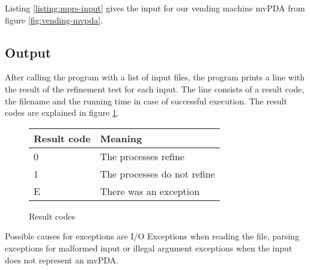 \begin{example}
Listing \ref{listing:mprs-input} gives the
input for our vending machine mvPDA from figure \ref{fig:vending-mvpda}.
\end{example}







\subsection{Output}

After calling the program with a list of input files, the program prints
a line with the result of the refinement test for each input.
The line consists of a result code, the filename and the running time
in case of successful execution. The result codes are explained in
figure \ref{fig:result-codes}.

\begin{figure}[ht]
  \centering
  \begin{tabular}{l|l}
    Result code & Meaning \\
    \hline
    {0} & The processes refine \\
    {1} & The processes do not refine  \\
    {E} & There was an exception
  \end{tabular}
  \label{fig:result-codes}
  \caption{Result codes}
\end{figure}

Possible causes for exceptions are I/O Exceptions when reading the file,
parsing exceptions for malformed input or illegal argument exceptions
when the input does not represent an mvPDA.

